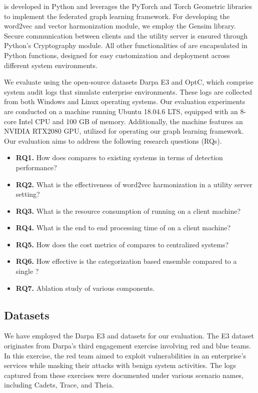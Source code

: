 \Sys is developed in Python and leverages the PyTorch and Torch Geometric libraries to implement the federated graph learning framework. For developing the word2vec and vector harmonization module, we employ the Gensim library. Secure communication between clients and the utility server is ensured through Python's Cryptography module. All other functionalities of \Sys are encapsulated in Python functions, designed for easy customization and deployment across different system environments.

We evaluate \Sys using the open-source datasets Darpa E3 and OptC, which comprise system audit logs that simulate enterprise environments. These logs are collected from both Windows and Linux operating systems. Our evaluation experiments are conducted on a machine running Ubuntu 18.04.6 LTS, equipped with an 8-core Intel CPU and 100 GB of memory. Additionally, the machine features an NVIDIA RTX2080 GPU, utilized for operating our graph learning framework. Our evaluation aims to address the following research questions (RQs).

\begin{itemize}[leftmargin=*]
\item \textbf{RQ1.} How does \Sys compares to existing systems in terms of detection performance?
\item \textbf{RQ2.} What is the effectiveness of word2vec harmonization in a utility server setting?
\item \textbf{RQ3.} What is the resource consumption of \Sys running on a client machine?
\item \textbf{RQ4.} What is the end to end processing time of \Sys on a client machine?
\item \textbf{RQ5.} How does the cost metrics of \Sys compares to centralized systems?
\item \textbf{RQ6.} How effective is the categorization based \gnnshort ensemble compared to a single \gnnshort?
\item \textbf{RQ7.} Ablation study of various \Sys components.
\end{itemize}

\subsection{Datasets}
We have employed the Darpa E3 and \optc datasets for our evaluation. The E3 dataset originates from Darpa's third engagement exercise involving red and blue teams. In this exercise, the red team aimed to exploit vulnerabilities in an enterprise's services while masking their attacks with benign system activities. The logs captured from these exercises were documented under various scenario names, including Cadets, Trace, and Theia.

